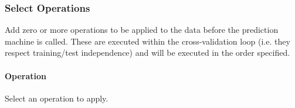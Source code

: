\subsubsection{Select Operations}
Add zero or more operations to be applied to the data before the prediction machine is called. These are executed within the cross-validation loop (i.e. they respect training/test independence) and will be executed in the order specified. 


\paragraph{Operation}
Select an operation to apply.

